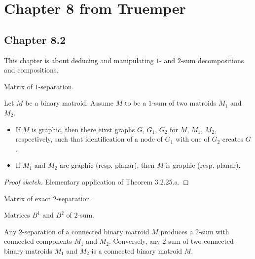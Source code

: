 \section{Chapter 8 from Truemper}

\subsection{Chapter 8.2}

This chapter is about deducing and manipulating $1$- and $2$-sum decompositions and compositions.

\begin{proposition}[8.2.1] %
  \label{prop:8.2.1}
  Matrix of $1$-separation.
\end{proposition}

\begin{lemma}[8.2.2]
  \label{lem:8.2.2}
  Let $M$ be a binary matroid. Assume $M$ to be a $1$-sum of two matroids $M_{1}$ and $M_{2}$.
  \begin{itemize}
    \item If $M$ is graphic, then there eixst graphs $G$, $G_{1}$, $G_{2}$ for $M$, $M_{1}$, $M_{2}$, respectively, such that identification of a node of $G_{1}$ with one of $G_{2}$ creates $G$.
    \item If $M_{1}$ and $M_{2}$ are graphic (resp. planar), then $M$ is graphic (resp. planar).
  \end{itemize}
\end{lemma}

\begin{proof}[Proof sketch]
  Elementary application of Theorem 3.2.25.a.
\end{proof}

\begin{proposition}[8.2.3]
  \label{prop:8.2.3}
  Matrix of exact $2$-separation.
\end{proposition}

\begin{proposition}[8.2.4] %
  \label{prop:8.2.4}
  Matrices $B^{1}$ and $B^{2}$ of $2$-sum.
\end{proposition}

\begin{lemma}[8.2.6]
  \label{lem:8.2.6}
  Any $2$-separation of a connected binary matroid $M$ produces a $2$-sum with connected components $M_{1}$ and $M_{2}$.
  Conversely, any $2$-sum of two connected binary matroids $M_{1}$ and $M_{2}$ is a connected binary matroid $M$.
\end{lemma}

